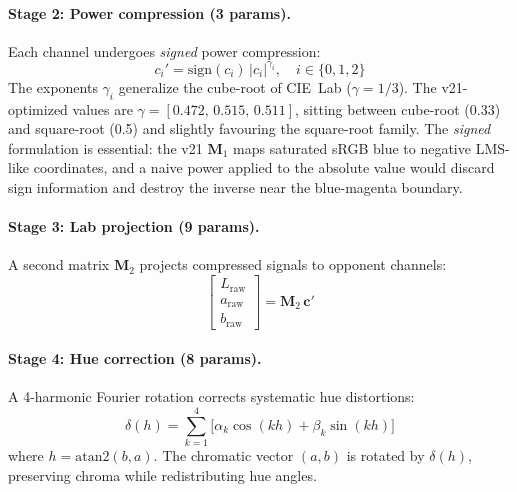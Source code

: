 \documentclass[11pt, twocolumn]{article}
\begin{document}
\paragraph{Stage 2: Power compression (3 params).}
Each channel undergoes \emph{signed} power compression:
\begin{equation}
  c_i' = \mathrm{sign}(c_i)\,|c_i|^{\gamma_i}, \quad i \in \{0,1,2\}
\end{equation}
The exponents $\gamma_i$ generalize the cube-root of CIE~Lab
($\gamma = 1/3$). The v21-optimized values are
$\gamma=[0.472,\,0.515,\,0.511]$, sitting between cube-root (0.33)
and square-root (0.5) and slightly favouring the square-root family.
The \emph{signed} formulation is essential: the v21 $\mathbf{M}_1$
maps saturated sRGB blue to negative LMS-like coordinates, and a
naive power applied to the absolute value would discard sign
information and destroy the inverse near the blue-magenta boundary.

\paragraph{Stage 3: Lab projection (9 params).}
A second matrix $\mathbf{M}_2$ projects compressed signals to
opponent channels:
\begin{equation}
  \begin{bmatrix} L_\mathrm{raw} \\ a_\mathrm{raw} \\ b_\mathrm{raw} \end{bmatrix} = \mathbf{M}_2 \, \mathbf{c}'
\end{equation}

\paragraph{Stage 4: Hue correction (8 params).}
A 4-harmonic Fourier rotation corrects systematic hue distortions:
\begin{equation}
  \delta(h) = \sum_{k=1}^{4}\!\bigl[\alpha_k\cos(kh) + \beta_k\sin(kh)\bigr]
\end{equation}
where $h = \mathrm{atan2}(b, a)$. The chromatic vector $(a,b)$ is
rotated by $\delta(h)$, preserving chroma while redistributing
hue angles.
\end{document}
